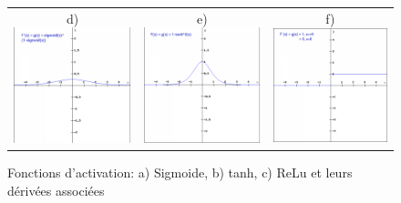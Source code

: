 \begin{figure}
\begin{tabular}{ccc}
         d) \includegraphics[scale=0.4]{./tex/fondamentaux/sigmoidder.png} &
         e) \includegraphics[scale=0.4]{./tex/fondamentaux/tanhder.png} &
         f) \includegraphics[scale=0.4]{./tex/fondamentaux/reluder.png}
    \end{tabular}
\caption{Fonctions d'activation: a) Sigmoide, b) tanh, c) ReLu et leurs dérivées associées}
\label{fig:my_label}
\end{figure}

